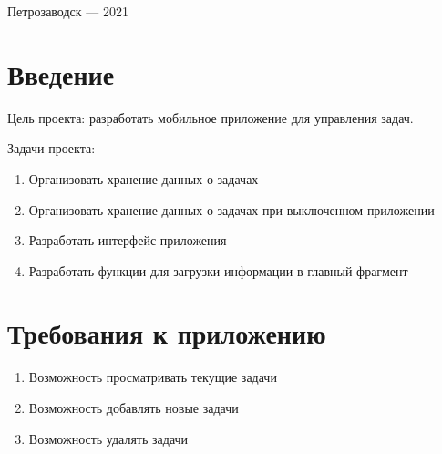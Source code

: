 \documentclass[a4paper,12pt]{article}
\begin{document}
\vfill

\begin{center}
    \large
    Петрозаводск --- 2021
\end{center}



\newpage

\tableofcontents





\newpage
\section*{Введение}

Цель проекта: разработать мобильное приложение для управления задач.

Задачи проекта:
\begin{enumerate}
    \item Организовать хранение данных о задачах
    \item Организовать хранение данных о задачах при выключенном приложении
    \item Разработать интерфейс приложения
    \item Разработать функции для загрузки информации в главный фрагмент
\end{enumerate}


\section{Требования к приложению}
\begin{enumerate}
    \item Возможность просматривать текущие задачи
    \item Возможность добавлять новые задачи
    \item Возможность удалять задачи
\end{enumerate}
\end{document}
